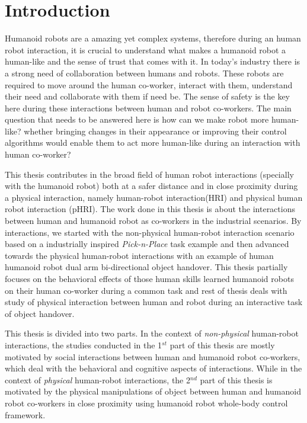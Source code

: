 
{\color{blue}\chapter*{Introduction}}
\pagestyle{plain}

Humanoid robots are a amazing yet complex systems, therefore during an human robot interaction, it is crucial to understand what makes a humanoid robot a human-like and the sense of trust that comes with it. In today's industry there is a strong need of collaboration between humans and robots. These robots are required to move around the human co-worker, interact with them, understand their need and collaborate with them if need be. The sense of safety is the key here during these interactions between human and robot co-workers. The main question that needs to be answered here is how can we make robot more human-like? whether bringing changes in their appearance or improving their control algorithms would enable them to act more human-like during an interaction with human co-worker?

This thesis contributes in the broad field of human robot interactions (specially with the humanoid robot) both at a safer distance and in close proximity during a physical interaction, namely human-robot interaction(HRI) and physical human robot interaction (pHRI). The work done in this thesis is about the interactions between human and humanoid robot as co-workers in the industrial scenarios. By interactions, we started with the non-physical human-robot interaction scenario based on a industrially inspired \textit{Pick-n-Place} task example and then advanced towards the physical human-robot interactions with an example of human humanoid robot dual arm bi-directional object handover. This thesis partially focuses on the behavioral effects of those human skills learned humanoid robots on their human co-worker during a common task and rest of thesis deals with study of physical interaction between human and robot during an interactive task of object handover.

This thesis is divided into two parts. In the context of \textit{non-physical} human-robot interactions, the studies conducted in the 1$^{st}$ part of this thesis are mostly motivated by social interactions between human and humanoid robot co-workers, which deal with the behavioral and cognitive aspects of interactions. While in the context of \textit{physical} human-robot interactions, the 2$^{nd}$ part of this thesis is motivated by the physical manipulations of object between human and humanoid robot co-workers in close proximity using humanoid robot whole-body control framework.


